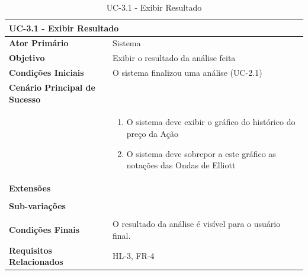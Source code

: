 \documentclass[12pt]{article}
\begin{document}
\begin{table}[H]
	\caption{UC-3.1 - Exibir Resultado}
	\label{tab:UC-3.1}
	\begin{tabular}{p{6cm} p{8cm}}
		\multicolumn{2}{l}{\large{\textbf{UC-3.1 - Exibir Resultado}}}\\
		\toprule
		\textbf{Ator Primário}		&	Sistema \\
		\midrule
		\textbf{Objetivo}			&	Exibir o resultado da análise feita \\
		\midrule
		\textbf{Condições Iniciais}	&	O sistema finalizou uma análise (UC-2.1) \\
		\midrule
		\textbf{Cenário Principal de Sucesso}	& \\
		& \begin{enumerate}
			\item O sistema deve exibir o gráfico do histórico do preço da Ação
			\item O sistema deve sobrepor a este gráfico as notações das Ondas de Elliott
		\end{enumerate}\\
		\midrule
		\textbf{Extensões}	& \\
		& \\
		\midrule
		\textbf{Sub-variações} & \\
		& \\
		\midrule
		\textbf{Condições Finais} & O resultado da análise é visível para o usuário final. \\
		\midrule
		\textbf{Requisitos Relacionados} & HL-3, FR-4 \\
		\bottomrule
	\end{tabular}		
\end{table}
\end{document}
